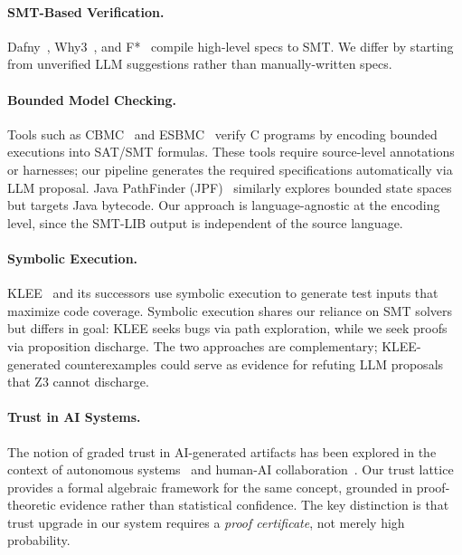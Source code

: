 \documentclass[11pt]{article}
\begin{document}
\paragraph{SMT-Based Verification.}
Dafny~\cite{Dafny}, Why3~\cite{Why3}, and F*~\cite{FStar} compile 
high-level specs to SMT. We differ by starting from unverified LLM suggestions 
rather than manually-written specs.

\paragraph{Bounded Model Checking.}
Tools such as CBMC~\cite{CBMC2004} and ESBMC~\cite{ESBMC2018} verify C
programs by encoding bounded executions into SAT/SMT formulas.  These
tools require source-level annotations or harnesses; our pipeline
generates the required specifications automatically via LLM proposal.
Java PathFinder (JPF)~\cite{JPF2005} similarly explores bounded state
spaces but targets Java bytecode.  Our approach is language-agnostic at
the encoding level, since the SMT-LIB output is independent of the
source language.

\paragraph{Symbolic Execution.}
KLEE~\cite{KLEE2008} and its successors use symbolic execution to
generate test inputs that maximize code coverage.  Symbolic execution
shares our reliance on SMT solvers but differs in goal: KLEE seeks
bugs via path exploration, while we seek proofs via proposition
discharge.  The two approaches are complementary; KLEE-generated
counterexamples could serve as evidence for refuting LLM proposals
that Z3 cannot discharge.

\paragraph{Trust in AI Systems.}
The notion of graded trust in AI-generated artifacts has been explored
in the context of autonomous systems~\cite{TrustAI2020} and human-AI
collaboration~\cite{HumanAI2021}.  Our trust lattice provides a formal
algebraic framework for the same concept, grounded in proof-theoretic
evidence rather than statistical confidence.  The key distinction is
that trust upgrade in our system requires a \emph{proof certificate},
not merely high probability.
\end{document}
